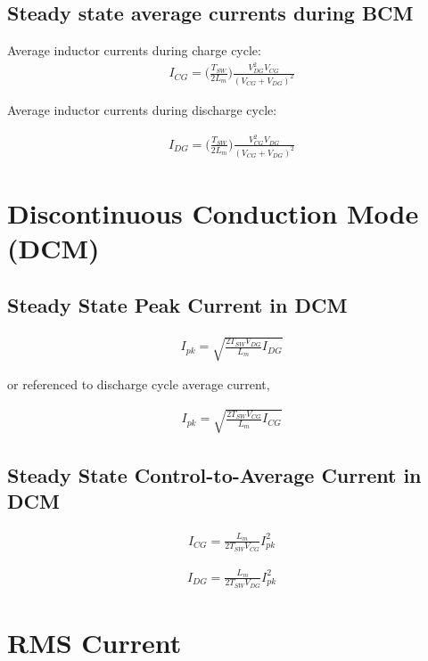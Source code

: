 \documentclass{scrartcl}
\begin{document}
		\subsection{Steady state average currents during BCM}
			Average inductor currents during charge cycle:
			\begin{align}
			I_{CG} = \bigg(\frac{T_{SW}}{2L_m}\bigg)\frac{V_{DG}^2 V_{CG}}{(V_{CG} + V_{DG})^2} 
			\end{align}			

		   Average inductor currents during discharge cycle:

			\begin{align}
			I_{DG} = \bigg(\frac{T_{SW}}{2L_m}\bigg)\frac{V_{CG}^2 V_{DG}}{(V_{CG} + V_{DG})^2} 
			\end{align}		

	\section{Discontinuous Conduction Mode (DCM)}
	
		\subsection{Steady State Peak Current in DCM}
		
		\begin{align}
		I_{pk} = \sqrt{\frac{2T_{SW}V_{DG}}{L_m}I_{DG}}
		\end{align}	
		
		or referenced to discharge cycle average current,
	
		\begin{align}
		I_{pk} = \sqrt{\frac{2T_{SW}V_{CG}}{L_m}I_{CG}}
		\end{align}	
		
		\subsection{Steady State Control-to-Average Current in DCM}

		\begin{align}
		I_{CG} = \frac{L_m}{2T_{SW}V_{CG}}I_{pk}^2
		\end{align}	

		\begin{align}
		I_{DG} = \frac{L_m}{2T_{SW}V_{DG}}I_{pk}^2
		\end{align}	
	
	\section{RMS Current}
	
\end{document}
